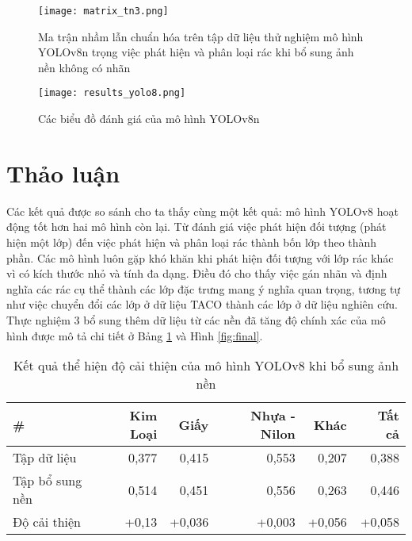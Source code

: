 \documentclass[../the.tex]{subfiles}
\begin{document}
\begin{figure}[H]
    \centering
    \texttt{[image: matrix\_tn3.png]}
    \caption{Ma trận nhầm lẫn chuẩn hóa trên tập dữ liệu thử nghiệm mô hình YOLOv8n trọng việc phát hiện và phân loại rác khi bổ sung ảnh nền không có nhãn}
    \label{fig:thucnghiem3.1}
\end{figure}

\begin{figure}[H]
    \centering
    \texttt{[image: results\_yolo8.png]}
    \caption{Các biểu đồ đánh giá của mô hình YOLOv8n}
    \label{fig:thucnghiem3.2}
\end{figure}


\section{Thảo luận}
 {\fontsize{13}{12} \selectfont

  Các kết quả được so sánh cho ta thấy cùng một kết quả: mô hình YOLOv8 hoạt động tốt hơn hai mô hình còn lại.
  Từ đánh giá việc phát hiện đối tượng (phát hiện một lớp) đến việc phát hiện và phân loại rác thành bốn lớp theo thành phần.
  Các mô hình luôn gặp khó khăn khi phát hiện đối tượng với lớp rác khác vì có kích thước nhỏ và tính đa dạng.
  Điều đó cho thấy việc gán nhãn và định nghĩa các rác cụ thể thành các lớp đặc trưng mang ý nghĩa quan trọng,
  tương tự như việc chuyển đổi các lớp ở dữ liệu TACO thành các lớp ở dữ liệu nghiên cứu.
  Thực nghiệm 3 bổ sung thêm dữ liệu từ các nền đã tăng độ chính xác của mô hình được mô tả chi tiết ở Bảng \ref{tab:thaoluan1} và Hình \ref{fig:final}.

 }


\begin{table}[h!]
    \centering
    \begin{threeparttable}
        \caption{Kết quả thể hiện độ cải thiện của mô hình YOLOv8 khi bổ sung ảnh nền}
        \begin{tabular}{lrrrrr}
            \hline
            \multicolumn{1}{l}{\textbf{\#}} & \textbf{Kim Loại} & \textbf{Giấy} & \textbf{Nhựa - Nilon} & \textbf{Khác} & \textbf{Tất cả} \\ \hline
            Tập dữ liệu                     & 0,377             & 0,415         & 0,553                 & 0,207         & 0,388           \\ \hline
            Tập bổ sung nền                 & 0,514             & 0,451         & 0,556                 & 0,263         & 0,446           \\ \hline
            Độ cải thiện                    & +0,13             & +0,036        & +0,003                & +0,056        & +0,058          \\ \hline
        \end{tabular}
        \label{tab:thaoluan1}
    \end{threeparttable}
\end{table}
\end{document}
